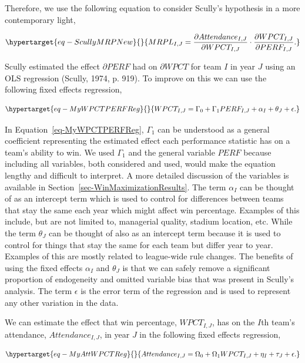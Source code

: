 \documentclass[
  12pt,
  letterpaper,
  DIV=11,
  numbers=noendperiod]{scrartcl}
\begin{document}
Therefore, we use the following equation to consider Scully's hypothesis
in a more contemporary light,

\begin{equation}\protect\hypertarget{eq-ScullyMRPNew}{}{
MRPL_{I,J}=\frac{\partial Attendance_{I,J}}{\partial WPCT_{I,J}}\cdot\frac{\partial WPCT_{I,J}}{\partial PERF_{I,J}}.
}\label{eq-ScullyMRPNew}\end{equation}

Scully estimated the effect \(\partial PERF\) had on \(\partial WPCT\)
for team \(I\) in year \(J\) using an OLS regression (Scully, 1974, p.
919). To improve on this we can use the following fixed effects
regression,

\begin{equation}\protect\hypertarget{eq-MyWPCTPERFReg}{}{
WPCT_{I,J}=\Gamma_0+\Gamma_1PERF_{I,J}+\alpha_I+\theta_J+\epsilon.
}\label{eq-MyWPCTPERFReg}\end{equation}

In Equation~\ref{eq-MyWPCTPERFReg}, \(\Gamma_1\) can be understood as a
general coefficient representing the estimated effect each performance
statistic has on a team's ability to win. We used \(\Gamma_1\) and the
general variable \(PERF\) because including all variables, both
considered and used, would make the equation lengthy and difficult to
interpret. A more detailed discussion of the variables is available in
Section~\ref{sec-WinMaximizationResults}. The term \(\alpha_I\) can be
thought of as an intercept term which is used to control for differences
between teams that stay the same each year which might affect win
percentage. Examples of this include, but are not limited to, managerial
quality, stadium location, etc. While the term \(\theta_J\) can be
thought of also as an intercept term because it is used to control for
things that stay the same for each team but differ year to year.
Examples of this are mostly related to league-wide rule changes. The
benefits of using the fixed effects \(\alpha_I\) and \(\theta_J\) is
that we can safely remove a significant proportion of endogeneity and
omitted variable bias that was present in Scully's analysis. The term
\(\epsilon\) is the error term of the regression and is used to
represent any other variation in the data.

We can estimate the effect that win percentage, \(WPCT_{I,J}\), has on
the \(I\)th team's attendance, \(Attendance_{I,J}\), in year \(J\) in
the following fixed effects regression,

\begin{equation}\protect\hypertarget{eq-MyAttWPCTReg}{}{
Attendance_{I,J}=\Omega_0+\Omega_1WPCT_{I,J}+\eta_I+\tau_J+\epsilon.
}\label{eq-MyAttWPCTReg}\end{equation}
\end{document}
